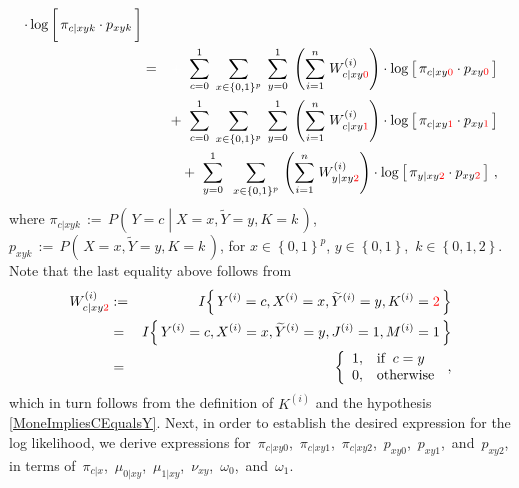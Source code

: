 \begin{enumerate}
\begin{eqnarray*}
	\cdot
	\log\left[\,
		\pi_{c \vert xyk} \overset{{\color{white}\vert}}{\cdot} p_{xyk}
	\,\right]
\\
&=&
	{\color{white}+} \;\;
	\overset{1}{\underset{c=0}{\sum}}
	\,\;\underset{x\in\{0,1\}^{p}}{\sum}\;\,
	\overset{1}{\underset{y=0}{\sum}}\;
	\left(\overset{n}{\underset{i=1}{\sum}}\;W^{(i)}_{c \vert xy{\color{red}0}}\right)
	\cdot
	\log\left[\,
		\pi_{c \vert xy\color{red}0} \cdot p_{xy\color{red}0}
	\,\right]
\\
&&
	+ \;\;
	\overset{1}{\underset{c=0}{\sum}}
	\,\;\underset{x\in\{0,1\}^{p}}{\sum}\;\,
	\overset{1}{\underset{y=0}{\sum}}\;
	\left(\overset{n}{\underset{i=1}{\sum}}\;W^{(i)}_{c \vert xy{\color{red}1}}\right)
	\cdot
	\log\left[\,
		\pi_{c \vert xy\color{red}1} \cdot p_{xy\color{red}1}
	\,\right]
\\
&&
	+ \;\;
	\overset{1}{\underset{y=0}{\sum}}\;
	\,\;\underset{x\in\{0,1\}^{p}}{\sum}\,
	\left(\overset{n}{\underset{i=1}{\sum}}\;W^{(i)}_{y \vert xy{\color{red}2}}\right)
	\cdot
	\log\left[\,
		\pi_{y \vert xy\color{red}2} \cdot p_{xy\color{red}2}
	\,\right]\,,
\end{eqnarray*}
where
\;$\pi_{c \vert xyk} \, := \, P\!\left(\,Y=c\;\left\vert\;X=x,\widetilde{Y}=y,K=k\right.\,\right)$,
\;$p_{xyk} \, := \, P\!\left(\,X=x,\widetilde{Y}=y,K=k\,\right)$,
\;for
\;$x \in \left\{0,1\right\}^{p}$,
\;$y \in \left\{0,1\right\}$,
\,$k \in \left\{0,1,2\right\}$.
\;Note that the last equality above follows from
\begin{eqnarray*}
W^{(i)}_{c \vert xy{\color{red}2}}
&:=&
	I\!\left\{\,Y^{(i)}=c,X^{(i)}=x,\widetilde{Y}^{(i)}=y,K^{(i)}={\color{red}2}\,\right\}
\\
&=&
	I\!\left\{\,Y^{(i)}=c,X^{(i)}=x,\widetilde{Y}^{(i)}=y,J^{(i)}=1,M^{(i)}=1\,\right\}
\\
&=&
	\left\{\begin{array}{cl}
		1, & \textnormal{if}\;\; c = y
		\\
		0, & \textnormal{otherwise}
	\end{array}\right.\,,
\end{eqnarray*}
which in turn follows from the definition of $K^{(i)}$ and
the hypothesis \eqref{MoneImpliesCEqualsY}.
Next, in order to establish the desired expression for the log likelihood,
we derive expressions for
\,$\pi_{c \vert xy0}$,
\,$\pi_{c \vert xy1}$,
\,$\pi_{c \vert xy2}$,
\,$p_{xy0}$,
\,$p_{xy1}$,
\,and
\,$p_{xy2}$,
in terms of
\,$\pi_{c \vert x}$,
\,$\mu_{0 \vert xy}$,
\,$\mu_{1 \vert xy}$,
\,$\nu_{xy}$,
\,$\omega_{0}$,
\,and
\,$\omega_{1}$.
\begin{eqnarray*}

\end{eqnarray*}
\end{enumerate}
